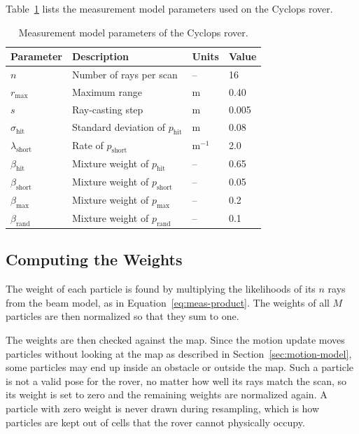 Table~\ref{tab:meas-params} lists the measurement model parameters used on the Cyclops rover.
\begin{table}[htbp]
  \centering
  \caption{Measurement model parameters of the Cyclops rover.}
  \label{tab:meas-params}
  \small
  \begin{tabular}{l l l l}
    \hline
    Parameter & Description & Units & Value \\
    \hline
    $n$                       & Number of rays per scan           & --       & 16 \\
    $r_{\max}$                & Maximum range                     & m        & 0.40 \\
    $s$                       & Ray-casting step                  & m        & 0.005 \\
    $\sigma_{\mathrm{hit}}$   & Standard deviation of $p_{\mathrm{hit}}$ & m & 0.08 \\
    $\lambda_{\mathrm{short}}$ & Rate of $p_{\mathrm{short}}$     & m$^{-1}$ & 2.0 \\
    $\beta_{\mathrm{hit}}$    & Mixture weight of $p_{\mathrm{hit}}$   & -- & 0.65 \\
    $\beta_{\mathrm{short}}$  & Mixture weight of $p_{\mathrm{short}}$ & -- & 0.05 \\
    $\beta_{\max}$            & Mixture weight of $p_{\max}$           & -- & 0.2 \\
    $\beta_{\mathrm{rand}}$   & Mixture weight of $p_{\mathrm{rand}}$  & -- & 0.1 \\
    \hline
  \end{tabular}
\end{table}


\subsection{Computing the Weights}
\label{sec:weights}

The weight of each particle is found by multiplying the likelihoods of its $n$ rays from the
beam model, as in Equation~\ref{eq:meas-product}. The weights
of all $M$ particles are then normalized so that they sum to one.

The weights are then checked against the map. Since the motion update moves particles
without looking at the map as described in Section~\ref{sec:motion-model}, some particles may end up inside
an obstacle or outside the map. Such a particle is not a valid pose for the rover, no matter
how well its rays match the scan, so its weight is set to zero and the remaining weights are
normalized again. A particle with zero weight is never drawn during resampling, which is how
particles are kept out of cells that the rover cannot physically occupy.


